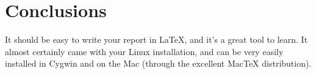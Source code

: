 \section{Conclusions}

It should be easy to write your report in LaTeX, and it's a great tool
to learn. It almost certainly came with your Linux installation, and
can be very easily installed in Cygwin and on the Mac (through the
excellent MacTeX distribution).

